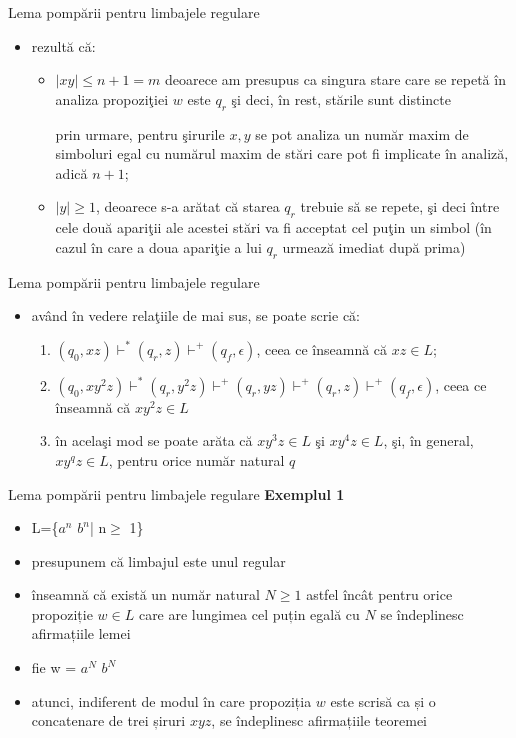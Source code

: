 \documentclass[pdf]{beamer}
\begin{document}
\begin{frame}{Lema pompării pentru limbajele regulare}
\begin{itemize}
\item
rezultă că:

\begin{itemize}
\item
$ |xy| \leq n + 1 = m $ deoarece am presupus ca singura stare care se repetă în analiza propoziţiei $ w $ este $ q_r $ şi deci, în rest, stările sunt distincte

prin urmare, pentru şirurile $ x, y $ se pot analiza un număr maxim de simboluri egal cu numărul maxim de stări care pot fi implicate în analiză, adică $ n + 1 $;
\item
$ |y| \geq 1 $, deoarece s-a arătat că starea $ q_r $ trebuie să se repete, şi deci între cele două apariţii ale acestei stări va fi acceptat cel puţin un simbol (în cazul în care a doua apariţie a lui $ q_r $ urmează imediat după prima)
\end{itemize}
\end{itemize}
\end{frame}



\begin{frame}{Lema pompării pentru limbajele regulare}
\begin{itemize}
\item
având în vedere relaţiile de mai sus, se poate scrie că:

\begin{enumerate}
\item
$ (q_0,xz) \vdash^* (q_r, z) \vdash^+ (q_f, \epsilon) $, ceea ce înseamnă că $ xz \in L $;
\item
$ (q_0,xy^{2}z) \vdash^* (q_r, y^{2}z) \vdash^+ (q_r, yz) \vdash^+ (q_r, z) \vdash^+ (q_f, \epsilon)$, ceea ce înseamnă că $ xy^{2}z \in L $
\item
în acelaşi mod se poate arăta că $ xy^{3}z \in L $ şi $ xy^{4}z \in L $, şi, în general, $ xy^{q}z \in L $, pentru orice număr natural $ q $
\end{enumerate}
\end{itemize}
\end{frame}



\begin{frame}{Lema pompării pentru limbajele regulare}
\textbf{Exemplul 1}
\begin{itemize}
\item
L=\{$a^{n}$ $b^{n}$| n$\geq$ 1\}
\item
presupunem că limbajul este unul regular
\item
înseamnă că există un număr natural $N \ge 1$ astfel încât pentru orice propoziție $w \in L$ care are lungimea cel puțin egală cu $N$ se îndeplinesc afirmațiile lemei
\item
fie w = $a^{N}$ $b^{N}$
\item
atunci, indiferent de modul în care propoziția $w$ este scrisă ca și o concatenare de trei șiruri $xyz$, se îndeplinesc afirmațiile teoremei
\end{itemize}
\end{frame}
\end{document}
